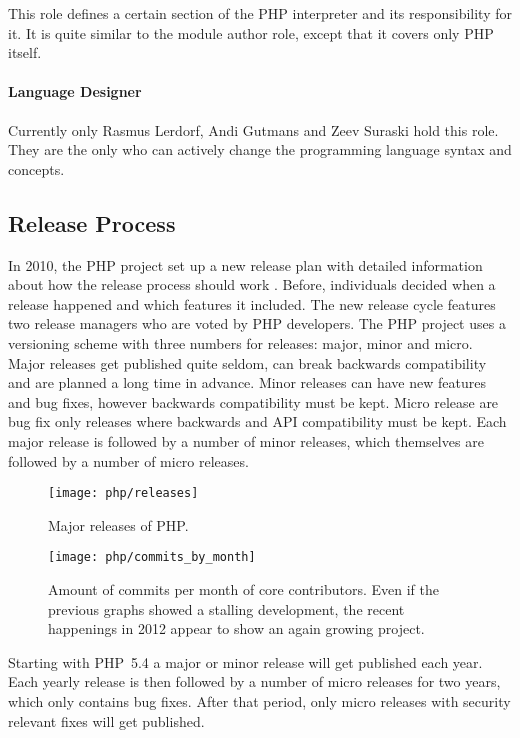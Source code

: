 This role defines a certain section of the PHP interpreter and its
responsibility for it. It is quite similar to the module author role, except
that it covers only PHP itself.

\paragraph{Language Designer}

Currently only Rasmus Lerdorf, Andi Gutmans and Zeev Suraski hold this role.
They are the only who can actively change the programming language syntax and
concepts.


\subsection{Release Process} %

In 2010, the PHP project set up a new release plan with detailed information
about how the release process should work \cite{PHPRelease}. Before,
individuals decided when a release happened and which features it included. The
new release cycle features two release managers who are voted by PHP
developers. The PHP project uses a versioning scheme with three numbers for
releases: major, minor and micro. Major releases get published quite seldom,
can break backwards compatibility and are planned a long time in advance. Minor
releases can have new features and bug fixes, however backwards compatibility
must be kept. Micro release are bug fix only releases where backwards and
\ac{API} compatibility must be kept. Each major release is followed by a number
of minor releases, which themselves are followed by a number of micro releases.

\vfill
\begin{figure}[hbtp]
  \centering
  \texttt{[image: php/releases]}
  \caption[Major Releases of PHP]{Major releases of PHP.}
\end{figure}

\begin{figure}[htbp]
  \centering
  \texttt{[image: php/commits\_by\_month]}
  \caption[Commits by Month, PHP]
  {Amount of commits per month of core contributors. Even if the previous
    graphs showed a stalling development, the recent happenings in 2012 appear
    to show an again growing project.}
  \label{fig:php:cbm}
\end{figure}

Starting with PHP~5.4 a major or minor release will get published each year.
Each yearly release is then followed by a number of micro releases for two
years, which only contains bug fixes. After that period, only micro releases
with security relevant fixes will get published.

